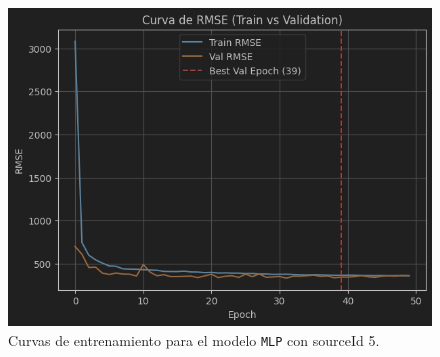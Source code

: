 \begin{figure}[H]
\begin{minipage}{0.48\textwidth}
		\includegraphics[width=\linewidth]{includes/cap5/graphs/sid5_mlp_rmse.png}
	\end{minipage}
	\caption{Curvas de entrenamiento para el modelo \texttt{MLP} con sourceId 5.}
	\label{fig:curvas_sid5_mlp}
\end{figure}

